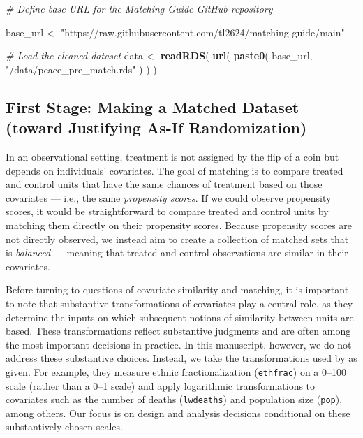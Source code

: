 \documentclass[
  12pt,
  leqno]{article}
\newenvironment{Shaded}{\begin{snugshade}}{\end{snugshade}}
\newcommand{\CommentTok}[1]{\textcolor[rgb]{0.56,0.35,0.01}{\textit{#1}}}
\newcommand{\FunctionTok}[1]{\textcolor[rgb]{0.13,0.29,0.53}{\textbf{#1}}}
\newcommand{\NormalTok}[1]{#1}
\newcommand{\OtherTok}[1]{\textcolor[rgb]{0.56,0.35,0.01}{#1}}
\newcommand{\StringTok}[1]{\textcolor[rgb]{0.31,0.60,0.02}{#1}}
\begin{document}
\singlespacing

\begin{Shaded}
\begin{Highlighting}[]
\CommentTok{\# Define base URL for the Matching Guide GitHub repository}

\NormalTok{base\_url }\OtherTok{\textless{}{-}} \StringTok{"https://raw.githubusercontent.com/tl2624/matching{-}guide/main"}

\CommentTok{\# Load the cleaned dataset}
\NormalTok{data }\OtherTok{\textless{}{-}} \FunctionTok{readRDS}\NormalTok{(}
  \FunctionTok{url}\NormalTok{(}
    \FunctionTok{paste0}\NormalTok{(}
\NormalTok{      base\_url, }\StringTok{"/data/peace\_pre\_match.rds"}
\NormalTok{    )}
\NormalTok{  )}
\NormalTok{)}
\end{Highlighting}
\end{Shaded}

\doublespacing

\subsection{First Stage: Making a Matched Dataset (toward Justifying
As-If
Randomization)}\label{first-stage-making-a-matched-dataset-toward-justifying-as-if-randomization}

In an observational setting, treatment is not assigned by the flip of a
coin but depends on individuals' covariates. The goal of matching is to
compare treated and control units that have the same chances of
treatment based on those covariates --- i.e., the same \emph{propensity
scores}. If we could observe propensity scores, it would be
straightforward to compare treated and control units by matching them
directly on their propensity scores. Because propensity scores are not
directly observed, we instead aim to create a collection of matched sets
that is \emph{balanced} --- meaning that treated and control
observations are similar in their covariates.

Before turning to questions of covariate similarity and matching, it is
important to note that substantive transformations of covariates play a
central role, as they determine the inputs on which subsequent notions
of similarity between units are based. These transformations reflect
substantive judgments and are often among the most important decisions
in practice. In this manuscript, however, we do not address these
substantive choices. Instead, we take the transformations used by
\citet{gilligansergenti2008} as given. For example, they measure ethnic
fractionalization (\texttt{ethfrac}) on a 0--100 scale (rather than a
0--1 scale) and apply logarithmic transformations to covariates such as
the number of deaths (\texttt{lwdeaths}) and population size
(\texttt{pop}), among others. Our focus is on design and analysis
decisions conditional on these substantively chosen scales.
\end{document}
